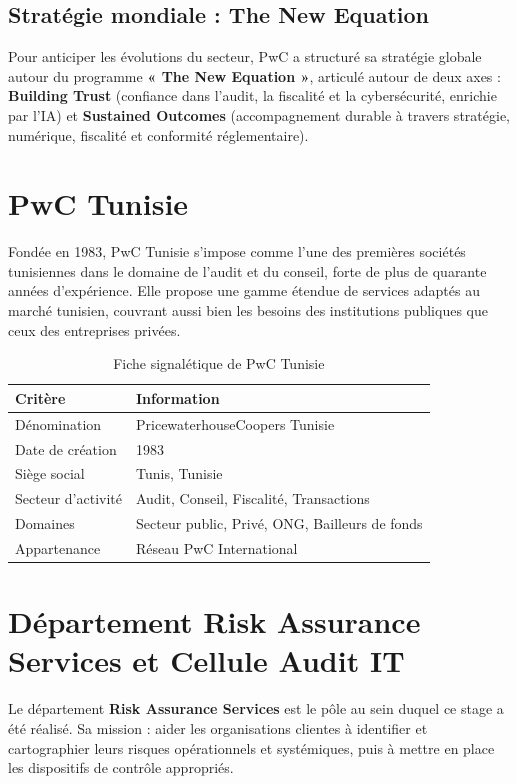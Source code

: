 \documentclass[12pt,a4paper,twoside]{report}
\begin{document}
\subsection{Stratégie mondiale : The New Equation}

Pour anticiper les évolutions du secteur, PwC a structuré sa stratégie globale autour du programme \textbf{« The New Equation »}, articulé autour de deux axes : \textbf{Building Trust} (confiance dans l'audit, la fiscalité et la cybersécurité, enrichie par l'IA) et \textbf{Sustained Outcomes} (accompagnement durable à travers stratégie, numérique, fiscalité et conformité réglementaire).

\section{PwC Tunisie}

Fondée en 1983, PwC Tunisie s'impose comme l'une des premières sociétés tunisiennes dans le domaine de l'audit et du conseil, forte de plus de quarante années d'expérience. Elle propose une gamme étendue de services adaptés au marché tunisien, couvrant aussi bien les besoins des institutions publiques que ceux des entreprises privées.

\begin{table}[H]
\centering
\caption{Fiche signalétique de PwC Tunisie}
\label{tab:fiche_pwc_tunisie}
\begin{tabular}{ll}
\toprule
\textbf{Critère}     & \textbf{Information} \\
\midrule
Dénomination         & PricewaterhouseCoopers Tunisie \\
Date de création     & 1983 \\
Siège social         & Tunis, Tunisie \\
Secteur d'activité   & Audit, Conseil, Fiscalité, Transactions \\
Domaines             & Secteur public, Privé, ONG, Bailleurs de fonds \\
Appartenance         & Réseau PwC International \\
\bottomrule
\end{tabular}
\end{table}

\section{Département Risk Assurance Services et Cellule Audit IT}

Le département \textbf{Risk Assurance Services} est le pôle au sein duquel ce stage a été réalisé. Sa mission : aider les organisations clientes à identifier et cartographier leurs risques opérationnels et systémiques, puis à mettre en place les dispositifs de contrôle appropriés.
\end{document}
